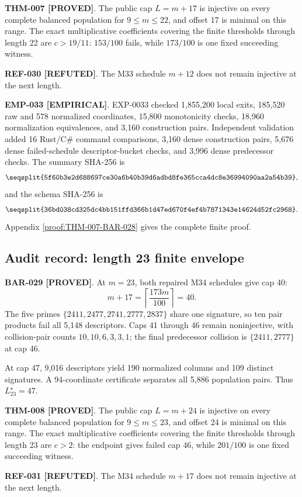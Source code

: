 \documentclass[11pt]{article}
\newcommand{\claimstatus}[2]{\textbf{#1 [#2]}}
\begin{document}
\claimstatus{THM-007}{PROVED}. The public cap \(L=m+17\) is injective on
every complete balanced population for \(9\le m\le22\), and offset 17 is
minimal on this range. The exact multiplicative coefficients covering the
finite thresholds through length 22 are \(c>19/11\): \(153/100\) fails,
while \(173/100\) is one fixed succeeding witness.

\claimstatus{REF-030}{REFUTED}. The M33 schedule \(m+12\) does not remain
injective at the next length.

\claimstatus{EMP-033}{EMPIRICAL}. EXP-0033 checked 1,855,200 local exits,
185,520 raw and 578 normalized coordinates, 15,800 monotonicity checks,
18,960 normalization equivalences, and 3,160 construction pairs.
Independent validation added 16 Rust/C\# command comparisons, 3,160 dense
construction pairs, 5,676 dense failed-schedule descriptor-bucket checks,
and 3,996 dense predecessor checks. The summary SHA-256 is
\[
\texttt{\seqsplit{5f60b3e2d688697ce30a6b40b39d6adbd8fe365cca4dc8e36994090aa2a54b39}},
\]
and the schema SHA-256 is
\[
\texttt{\seqsplit{36bd038cd325dc4bb151ffd366b1d47ed670f4ef4b7871343e14624d52fc2968}}.
\]
Appendix \ref{proof:THM-007-BAR-028} gives the complete finite proof.

\subsection{Audit record: length 23 finite envelope}

\claimstatus{BAR-029}{PROVED}. At \(m=23\), both repaired M34 schedules give
cap 40:
\[
m+17=\left\lceil\frac{173m}{100}\right\rceil=40.
\]
The five primes \(\{2411,2477,2741,2777,2837\}\) share one signature, so
ten pair products fail all 5,148 descriptors. Caps 41 through 46 remain
noninjective, with collision-pair counts \(10,10,6,3,3,1\); the final
predecessor collision is \(\{2411,2777\}\) at cap 46.

At cap 47, 9,016 descriptors yield 190 normalized columns and 109 distinct
signatures. A 94-coordinate certificate separates all 5,886 population
pairs. Thus \(L_{23}^\star=47\).

\claimstatus{THM-008}{PROVED}. The public cap \(L=m+24\) is injective on
every complete balanced population for \(9\le m\le23\), and offset 24 is
minimal on this range. The exact multiplicative coefficients covering the
finite thresholds through length 23 are \(c>2\): the endpoint gives failed
cap 46, while \(201/100\) is one fixed succeeding witness.

\claimstatus{REF-031}{REFUTED}. The M34 schedule \(m+17\) does not remain
injective at the next length.
\end{document}
